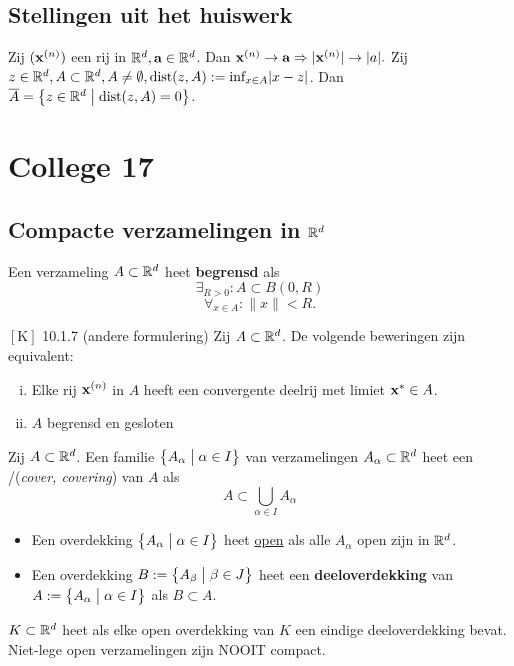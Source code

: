 \documentclass{2wa40summary}
\begin{document}
	\subsection{Stellingen uit het huiswerk}
	\theorem Zij $({\textbf{x}}^{(n)})$ een rij in $\mathbb{R}^d, {\textbf{a}} \in \mathbb{R}^d$. Dan ${\textbf{x}}^{(n)}\rightarrow {\textbf{a}} \Rightarrow |{\textbf{x}}^{(n)}|\rightarrow |a|.$
	\theorem Zij $z \in \mathbb{R}^d, A \subset \mathbb{R}^d, A \neq \emptyset, \text{dist}(z,A) := \text{inf}_{x\in A}|x-z|$.
	Dan $\overline{A}=\big\{z\in \mathbb{R}^d \bigm| \text{dist}(z,A)=0\big\}$.
	\newpage
	\section{College 17}
	\subsection{Compacte verzamelingen in $\mathbb{R}^d$}
	 Een verzameling $A\subset\mathbb{R}^d$ heet \textbf{begrensd} als \[\exists _{R>0}: A \subset B(0,R)\]
	\[\forall _{x\in A}: \|x\|<R.\]
	
	\theorem $\left[\text{K}\right]$ 10.1.7 (andere formulering)
	Zij $A \subset \mathbb{R}^d$. De volgende beweringen zijn equivalent:
	\begin{enumerate}[(i)]
		\item Elke rij ${\textbf{x}}^{(n)}$ in $A$ heeft een convergente deelrij met limiet ${\textbf{x}}^* \in A$.
		\item $A$ begrensd en gesloten
	\end{enumerate}
	
	 Zij $A \subset \mathbb{R}^d$. Een familie $\big\{A_\alpha \bigm| \alpha \in I \big\}$ van verzamelingen $A_\alpha \subset \mathbb{R}^d$ heet een /(\textit{cover, covering}) van $A$ als \[A \subset \bigcup_{\alpha \in I}A_\alpha\]
	
	\begin{itemize}
		\item Een overdekking $\big\{ A_\alpha \bigm| \alpha \in I \big\}$ heet \underline{open} als alle $A_\alpha$ open zijn in $\mathbb{R}^d$.
		\item Een overdekking $B:=\big\{ A_\beta \bigm| \beta \in J\big\}$ heet een \textbf{deeloverdekking} van $A:=\big\{ A_\alpha \bigm| \alpha \in I \big\}$ als $B \subset A$.
	\end{itemize}
	
	 $K \subset \mathbb{R}^d$ heet  als elke open overdekking van $K$ een eindige deeloverdekking bevat.
	\note Niet-lege open verzamelingen zijn NOOIT compact.
	
\end{document}
